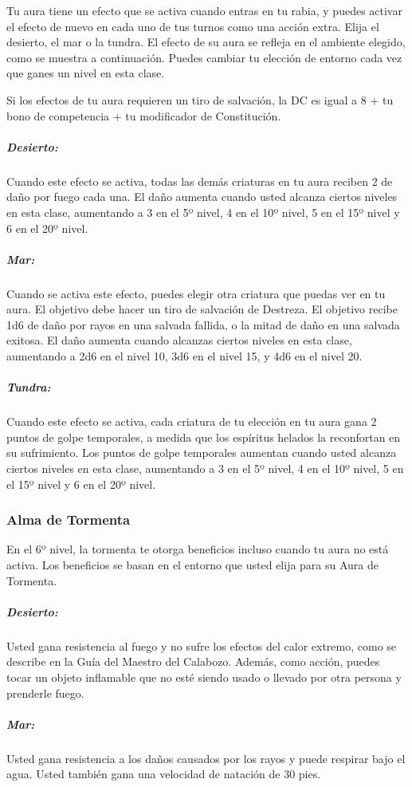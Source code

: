 \documentclass[a4paper,twocolumn,openany,10pt]{dndbook}
\begin{document}
Tu aura tiene un efecto que se activa cuando entras en tu rabia, y puedes activar el efecto de nuevo en cada uno de tus turnos como una
acción extra. Elija el desierto, el mar o la tundra. El efecto de su aura se refleja en el ambiente elegido, como se muestra a continuación.
Puedes cambiar tu elección de entorno cada vez que ganes un nivel en esta clase.

Si los efectos de tu aura requieren un tiro de salvación, la DC es igual a 8 + tu bono de competencia + tu modificador de Constitución.

\subparagraph{Desierto:} Cuando este efecto se activa, todas las demás criaturas en tu aura reciben 2 de daño por fuego cada una. El daño
aumenta cuando usted alcanza ciertos niveles en esta clase, aumentando a 3 en el 5º nivel, 4 en el 10º nivel, 5 en el 15º nivel y 6 en el
20º nivel.

\subparagraph{Mar:} Cuando se activa este efecto, puedes elegir otra criatura que puedas ver en tu aura. El objetivo debe hacer un tiro de
salvación de Destreza. El objetivo recibe 1d6 de daño por rayos en una salvada fallida, o la mitad de daño en una salvada exitosa. El daño
aumenta cuando alcanzas ciertos niveles en esta clase, aumentando a 2d6 en el nivel 10, 3d6 en el nivel 15, y 4d6 en el nivel 20.

\subparagraph{Tundra:} Cuando este efecto se activa, cada criatura de tu elección en tu aura gana 2 puntos de golpe temporales, a medida que los
espíritus helados la reconfortan en su sufrimiento. Los puntos de golpe temporales aumentan cuando usted alcanza ciertos niveles en esta
clase, aumentando a 3 en el 5º nivel, 4 en el 10º nivel, 5 en el 15º nivel y 6 en el 20º nivel.

\subsubsection{Alma de Tormenta}
En el 6º nivel, la tormenta te otorga beneficios incluso cuando tu aura no está activa. Los beneficios se basan en el entorno que usted elija
para su Aura de Tormenta.

\subparagraph{Desierto:} Usted gana resistencia al fuego y no sufre los efectos del calor extremo, como se describe en la Guía del Maestro del
Calabozo. Además, como acción, puedes tocar un objeto inflamable que no esté siendo usado o llevado por otra persona y prenderle fuego.

\subparagraph{Mar:} Usted gana resistencia a los daños causados por los rayos y puede respirar bajo el agua. Usted también gana una velocidad de
natación de 30 pies.
\end{document}
